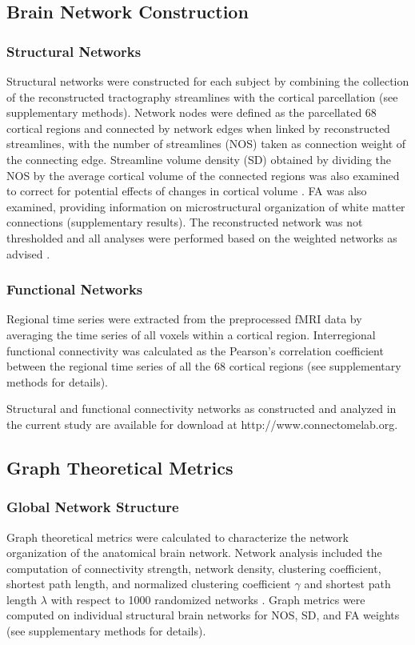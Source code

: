 \begin{refsection}
\subsection*{Brain Network Construction}
\subsubsection*{Structural Networks}
Structural networks were constructed for each subject by combining the collection of the reconstructed tractography streamlines with the cortical parcellation (see supplementary methods). Network nodes were defined as the parcellated 68 cortical regions and connected by network edges when linked by reconstructed streamlines, with the number of streamlines (NOS) taken as connection weight of the connecting edge. Streamline volume density (SD) obtained by dividing the NOS by the average cortical volume of the connected regions was also examined to correct for potential effects of changes in cortical volume \citep{vanDenHeuvel2011RichclubOO,Hagmann2008MappingTS}. FA was also examined, providing information on microstructural organization of white matter connections (supplementary results). The reconstructed network was not thresholded and all analyses were performed based on the weighted networks as advised \citep{vanWijk2010ComparingBN,vanDenHeuvel2017ProportionalTI}.

\subsubsection*{Functional Networks}
Regional time series were extracted from the preprocessed fMRI data by averaging the time series of all voxels within a cortical region. Interregional functional connectivity was calculated as the Pearson’s correlation coefficient between the regional time series of all the 68 cortical regions (see supplementary methods for details).

Structural and functional connectivity networks as constructed and analyzed in the current study are available for download at http://www.connectomelab.org.

\subsection*{Graph Theoretical Metrics}
\subsubsection*{Global Network Structure}
Graph theoretical metrics were calculated to characterize the network organization of the anatomical brain network. Network analysis included the computation of connectivity strength, network density, clustering coefficient, shortest path length, and normalized clustering coefficient $\gamma$ and shortest path length $\lambda$ with respect to 1000 randomized networks \citep{RUBINOV20101059}. Graph metrics were computed on individual structural brain networks for NOS, SD, and FA weights (see supplementary methods for details).


\end{refsection}
